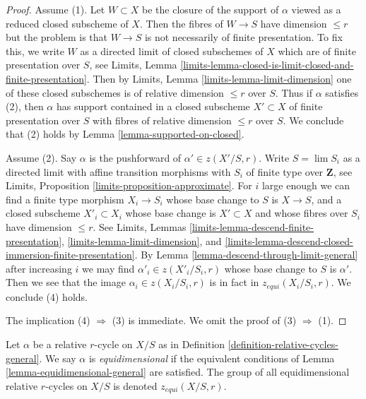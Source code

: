 \begin{proof}
Assume (1). Let $W \subset X$ be the closure of the support of $\alpha$
viewed as a reduced closed subscheme of $X$. Then the fibres of $W \to S$
have dimension $\leq r$ but the problem is that $W \to S$ is not necessarily
of finite presentation. To fix this, we
write $W$ as a directed limit of closed subschemes of $X$ which are
of finite presentation over $S$, see Limits, Lemma
\ref{limits-lemma-closed-is-limit-closed-and-finite-presentation}.
Then by Limits, Lemma \ref{limits-lemma-limit-dimension}
one of these closed subschemes is of relative dimension $\leq r$ over $S$.
Thus if $\alpha$ satisfies (2), then $\alpha$ has support contained
in a closed subscheme $X' \subset X$ of finite presentation over $S$
with fibres of relative dimension $\leq r$ over $S$.
We conclude that (2) holds by Lemma \ref{lemma-supported-on-closed}.

\medskip\noindent
Assume (2). Say $\alpha$ is the pushforward of $\alpha' \in z(X'/S, r)$.
Write $S = \lim S_i$ as a directed limit with affine transition
morphisms with $S_i$ of finite type over $\mathbf{Z}$,
see Limits, Proposition \ref{limits-proposition-approximate}.
For $i$ large enough we can find a finite type morphism $X_i \to S_i$
whose base change to $S$ is $X \to S$, and a closed subscheme
$X'_i \subset X_i$ whose base change is $X' \subset X$ and whose
fibres over $S_i$ have dimension $\leq r$. See
Limits, Lemmas
\ref{limits-lemma-descend-finite-presentation},
\ref{limits-lemma-limit-dimension}, and
\ref{limits-lemma-descend-closed-immersion-finite-presentation}.
By Lemma \ref{lemma-descend-through-limit-general}
after increasing $i$ we may find
$\alpha'_i \in z(X'_i/S_i, r)$ whose base change to $S$ is $\alpha'$.
Then we see that the image $\alpha_i \in z(X_i/S_i, r)$
is in fact in $z_{equi}(X_i/S_i, r)$. We conclude (4) holds.

\medskip\noindent
The implication (4) $\Rightarrow$ (3) is immediate.
We omit the proof of (3) $\Rightarrow$ (1).
\end{proof}

\begin{definition}
\label{definition-equidimensional-general}
Let $\alpha$ be a relative $r$-cycle on $X/S$ as in
Definition \ref{definition-relative-cycles-general}.
We say $\alpha$ is {\it equidimensional} if the equivalent conditions
of Lemma \ref{lemma-equidimensional-general} are satisfied.
The group of all equidimensional relative $r$-cycles on $X/S$ is
denoted $z_{equi}(X/S, r)$.
\end{definition}

